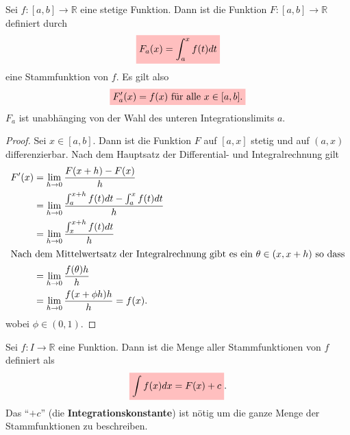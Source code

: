 \documentclass[12pt]{article}
\newcommand{\R}{\mathbb{R}} %
\newcommand{\inttext}{\shortintertext}
\newenvironment{definition}[2][Definition]{\begin{trivlist}
        \item[\hskip \labelsep {\bfseries #1}\hskip \labelsep {\bfseries #2.}]}{\flushright{$\square$}\end{trivlist}}
\newenvironment{lemma}[2][Theorem]{\begin{trivlist}
        \item[\hskip \labelsep {\bfseries #1}\hskip \labelsep {\bfseries #2.}]}{\flushright{$\square$}\end{trivlist}}
\begin{document}
\begin{lemma}{[Hauptsatz der Differential- und Integralrechnung]}
    Sei $f: [a,b] \to \R$ eine stetige Funktion. Dann ist die Funktion $F: [a,b] \to \R$ definiert durch
    \begin{align}
        \colorbox{pink}{$\displaystyle F_a(x)=\int_{a}^{x}f(t)dt$}
    \end{align}
    eine Stammfunktion von $f$. Es gilt also
    \begin{align}
        \colorbox{pink}{$\displaystyle F_a'(x)=f(x) \text{ für alle } x \in [a,b].$}
    \end{align}
    $F_a$ ist unabhänging von der Wahl des unteren Integrationslimits $a$.

    \begin{proof}
        Sei $x \in [a,b]$. Dann ist die Funktion $F$ auf $[a,x]$ stetig und auf $(a,x)$ differenzierbar. Nach dem Hauptsatz der Differential- und Integralrechnung gilt
        \begin{align*}
            F'(x) & =\lim_{h \to 0}\frac{F(x+h)-F(x)}{h}                             \\
                  & =\lim_{h \to 0}\frac{\int_{a}^{x+h}f(t)dt-\int_{a}^{x}f(t)dt}{h} \\
                  & =\lim_{h \to 0}\frac{\int_{x}^{x+h}f(t)dt}{h}                    \\
                  \inttext{Nach dem Mittelwertsatz der Integralrechnung gibt es ein $\theta \in (x,x+h)$ so dass}
                  & =\lim_{h \to 0}\frac{f(\theta)h}{h}\\
                  &=\lim_{h \to 0}\frac{f(x+\phi h)h}{h}=f(x). 
        \end{align*}
        wobei $\phi \in (0,1)$.
    \end{proof}
\end{lemma}

\begin{definition}{[Unbestimmtes Integral]}
    Sei $f: I \to \R$ eine Funktion. Dann ist die Menge aller Stammfunktionen von $f$ definiert als
    \begin{align}
        \colorbox{pink}{\mathstrut$\displaystyle\int f(x)dx = F(x)+c$}.
    \end{align}
    Das ``$+c$'' (die \textbf{Integrationskonstante}) ist nötig um die ganze Menge der Stammfunktionen zu beschreiben.
\end{definition}
\end{document}
